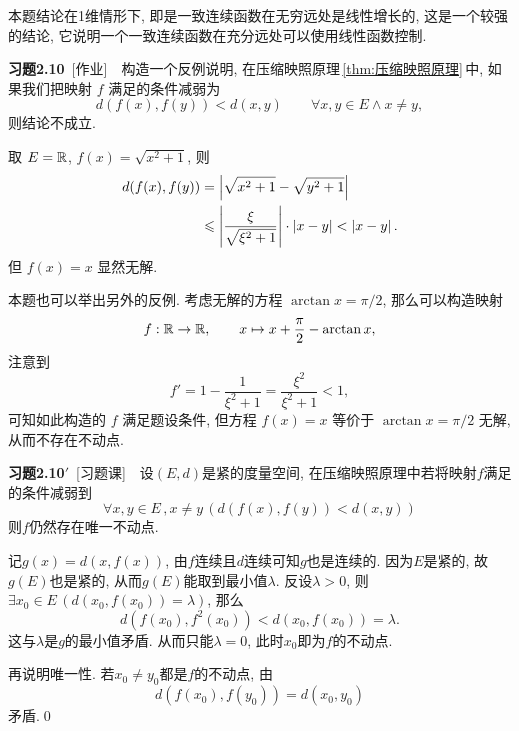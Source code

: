     \begin{Remark}
        本题结论在1维情形下, 即是一致连续函数在无穷远处是线性增长的, 这是一个较强的结论, 它说明一个一致连续函数在充分远处可以使用线性函数控制.
    \end{Remark}

    \textbf{习题2.10}\ [作业]\ \ 构造一个反例说明, 在压缩映照原理\,\ref{thm:压缩映照原理}\,中, 如果我们把映射 $ f $ 满足的条件减弱为
    \[
        d(f(x), f(y))<d(x, y)\qquad \forall x, y\in E\wedge x\neq y,
    \]
    则结论不成立.

    \begin{Solution}
        取 $ E=\mathbb{R} $, $ f(x)=\sqrt{x^{2}+1} $, 则
        \[
            \begin{aligned}
                d(f(x), f(y)) & =\left| \sqrt{x^{2}+1}-\sqrt{y^{2}+1} \right| \\
                & \leqslant\left| \frac{\xi}{\sqrt{\xi^{2}+1}} \right| \cdot\left| x-y \right| <\left| x-y \right| .
            \end{aligned}
        \]
        但 $ f(x)=x $ 显然无解.
    \end{Solution}
    \begin{Remark}
        本题也可以举出另外的反例. 考虑无解的方程 $ \arctan x=\pi/2 $, 那么可以构造映射
        \[
            f : \mathbb{R}\to\mathbb{R},\qquad x\mapsto x+\frac\pi 2-\arctan x,
        \]
        注意到
        \[
            f'=1-\frac{1}{\xi^2+1}=\frac{\xi^2}{\xi^2+1}<1,
        \]
        可知如此构造的 $ f $ 满足题设条件, 但方程 $ f(x)=x $ 等价于 $ \arctan x=\pi/2 $ 无解, 从而不存在不动点.
    \end{Remark}

    \textbf{习题2.10$\bm{'}$}\ [习题课]\ \ 设$ (E,d) $是紧的度量空间, 在压缩映照原理中若将映射$ f $满足的条件减弱到
    \[
    \forall x,y\in E\,,x\ne y\,(d(f(x),f(y))<d(x,y))
    \]
    则$ f $仍然存在唯一不动点.
    \begin{Proof}
    记$ g(x)=d(x,f(x)) $, 由$ f $连续且$ d $连续可知$ g $也是连续的. 因为$ E $是紧的, 故$ g(E) $也是紧的, 从而$ g(E) $能取到最小值$ \lambda $. 反设$ \lambda>0 $, 则$ \exists x_0\in E\,(d(x_0,f(x_0))=\lambda) $, 那么
    \[
    d(f(x_0),f^2(x_0))<d(x_0,f(x_0))=\lambda.
    \]
    这与$ \lambda $是$ g $的最小值矛盾. 从而只能$ \lambda=0 $, 此时$ x_0 $即为$ f $的不动点.

    再说明唯一性. 若$ x_0\ne y_0 $都是$ f $的不动点, 由
    \[
    d(f(x_0),f(y_0))=d(x_0,y_0)
    \]
    矛盾.\qed
    \end{Proof}

